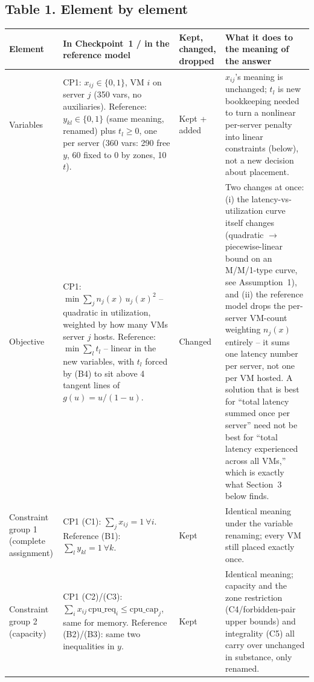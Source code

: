 \documentclass[11pt,a4paper]{article}
\begin{document}
\subsection*{Table 1. Element by element}
{\small
\begin{tabularx}{\textwidth}{@{}p{2.6cm}Xp{1.7cm}X@{}}
\toprule
Element & In Checkpoint~1 / in the reference model & Kept, changed, dropped & What it does to the meaning of the answer\\
\midrule
Variables & CP1: $x_{ij}\in\{0,1\}$, VM $i$ on server $j$ (350 vars, no auxiliaries). Reference: $y_{kl}\in\{0,1\}$ (same meaning, renamed) plus $t_l\ge0$, one per server (360 vars: 290 free $y$, 60 fixed to 0 by zones, 10 $t$). & Kept + added & $x_{ij}$'s meaning is unchanged; $t_l$ is new bookkeeping needed to turn a nonlinear per-server penalty into linear constraints (below), not a new decision about placement.\\
Objective & CP1: $\min \sum_j n_j(x)\,u_j(x)^2$ -- quadratic in utilization, weighted by how many VMs server $j$ hosts. Reference: $\min \sum_l t_l$ -- linear in the new variables, with $t_l$ forced by (B4) to sit above 4 tangent lines of $g(u)=u/(1-u)$. & Changed & Two changes at once: (i) the latency-vs-utilization curve itself changes (quadratic $\to$ piecewise-linear bound on an M/M/1-type curve, see Assumption~1), and (ii) the reference model drops the per-server VM-count weighting $n_j(x)$ entirely -- it sums one latency number per server, not one per VM hosted. A solution that is best for ``total latency summed once per server'' need not be best for ``total latency experienced across all VMs,'' which is exactly what Section~3 below finds.\\
Constraint group 1 (complete assignment) & CP1 (C1): $\sum_j x_{ij}=1\ \forall i$. Reference (B1): $\sum_l y_{kl}=1\ \forall k$. & Kept & Identical meaning under the variable renaming; every VM still placed exactly once.\\
Constraint group 2 (capacity) & CP1 (C2)/(C3): $\sum_i x_{ij}\,\mathrm{cpu\_req}_i\le \mathrm{cpu\_cap}_j$, same for memory. Reference (B2)/(B3): same two inequalities in $y$. & Kept & Identical meaning; capacity and the zone restriction (C4/forbidden-pair upper bounds) and integrality (C5) all carry over unchanged in substance, only renamed.\\

\end{tabularx}}
\end{document}
